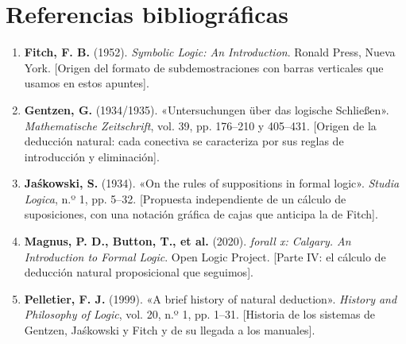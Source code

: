 \section*{Referencias bibliográficas}

\begin{enumerate}
    \item \textbf{Fitch, F. B.} (1952). \emph{Symbolic Logic: An Introduction}. Ronald Press, Nueva York. [Origen del formato de subdemostraciones con barras verticales que usamos en estos apuntes].
    \item \textbf{Gentzen, G.} (1934/1935). «Untersuchungen über das logische Schließen». \emph{Mathematische Zeitschrift}, vol. 39, pp. 176--210 y 405--431. [Origen de la deducción natural: cada conectiva se caracteriza por sus reglas de introducción y eliminación].
    \item \textbf{Jaśkowski, S.} (1934). «On the rules of suppositions in formal logic». \emph{Studia Logica}, n.º 1, pp. 5--32. [Propuesta independiente de un cálculo de suposiciones, con una notación gráfica de cajas que anticipa la de Fitch].
    \item \textbf{Magnus, P. D., Button, T., et al.} (2020). \emph{forall x: Calgary. An Introduction to Formal Logic}. Open Logic Project. [Parte IV: el cálculo de deducción natural proposicional que seguimos].
    \item \textbf{Pelletier, F. J.} (1999). «A brief history of natural deduction». \emph{History and Philosophy of Logic}, vol. 20, n.º 1, pp. 1--31. [Historia de los sistemas de Gentzen, Jaśkowski y Fitch y de su llegada a los manuales].
\end{enumerate}

